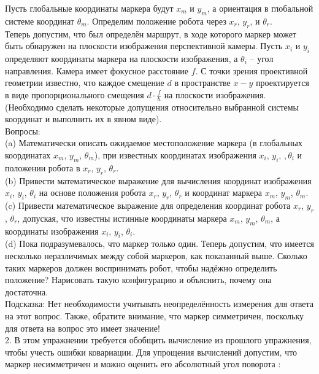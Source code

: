 \documentclass[10pt,a4paper]{article}
\begin{document}
Пусть глобальные координаты маркера будут $x_m$ и $y_m$, а ориентация в глобальной системе координат $\theta_m$. Определим положение робота через $x_r$, $y_r$, и $\theta_r$.\\

Теперь допустим, что был определён маршрут, в ходе которого маркер может быть обнаружен на плоскости изображения перспективной камеры. Пусть $x_i$ и $y_i$ определяют координаты маркера на плоскости изображения, а $\theta_i$ – угол направления.
Камера имеет фокусное расстояние $f$. С точки зрения проективной геометрии известно, что каждое смещение $d$ в пространстве $x-y$ проектируется в виде пропорционального смещения $d\cdot\frac{f}{h}$ на плоскости изображения. (Необходимо сделать некоторые допущения относительно выбранной системы координат и выполнить их в явном виде).\\

Вопросы:\\

(a) Математически описать ожидаемое местоположение маркера (в глобальных координатах $x_m$, $y_m$, $\theta_m$), при известных координатах изображения $x_i$, $y_i$, $,\theta_i$  и положении робота в $x_r$, $y_r$, $\theta_r$.\\

(b) Привести математическое выражение для вычисления координат изображения $x_i$, $y_i$, $\theta_i$ на основе положения робота $x_r$, $y_r$, $\theta_r$ и координат маркера $x_m$, $y_m$, $\theta_m$.\\

(c) Привести математическое выражение для определения координат робота $x_r$, $y_r$, $\theta_r$, допуская, что известны истинные координаты маркера $x_m$, $y_m$, $\theta_m$, а координаты изображения $x_i$, $y_i$, $\theta_i$.\\

(d) Пока подразумевалось, что маркер только один. Теперь допустим, что имеется несколько неразличимых между собой маркеров, как показанный выше. 
Сколько таких маркеров должен воспринимать робот, чтобы надёжно определить положение? Нарисовать такую конфигурацию и объяснить, почему она достаточна.\\ 

Подсказка: Нет необходимости учитывать неопределённость измерения для ответа на этот вопрос. Также, обратите внимание, что маркер симметричен, поскольку  для ответа на вопрос это имеет значение! \\

2. В этом упражнении требуется обобщить вычисление из прошлого упражнения, чтобы учесть ошибки ковариации. Для упрощения вычислений допустим, что маркер несимметричен и можно оценить его абсолютный угол поворота :
\end{document}
